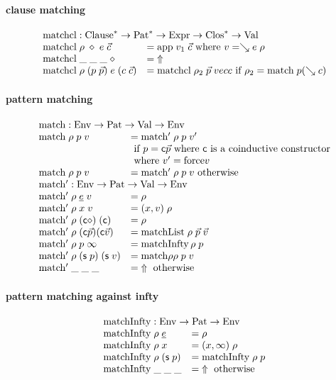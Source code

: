 \paragraph*{clause matching}
\[
\begin{array}{ll}
\multicolumn{2}{l}{\matchcl : \ves{\Clause} \ra \ves{\Pat} \ra \Expr \ra \ves{\Clos} \ra \Val}\\
\matchcl \; \rho \; \diamond \; e \; \vec{c} & = \ap \; v_1 \; \vec{c} \mbox{ where } v = \wh e \; \rho \\
\matchcl \; \_ \; \_\; \_ \; \diamond & = \stuck \\
\matchcl \; \rho \; (p \; \vec{p}) \; e \; (c \; \vec{c}) & = \matchcl \; \rho_2 \; \vec{p} \; vec{c} \mbox{ if } \rho_2 = \match \; p (\wh c)   
\end{array}
\]

\paragraph*{pattern matching}
\[
\begin{array}{ll}
\multicolumn{2}{l}{\match : \Env \ra \Pat \ra \Val \ra \Env}\\
\match \; \rho \; p \; v & = \matchf \; \rho \; p \; v' \\
& \mbox{ if } p = \cc \vec{p} \mbox{ where } \cc  \mbox{ is a coinductive constructor}\\
& \mbox{ where } v' = \forc v \\
\match \; \rho \; p \; v & = \matchf \; \rho \; p \; v \mbox{ otherwise}\\
\multicolumn{2}{l}{\matchf : \Env \ra \Pat \ra \Val \ra \Env}\\
\matchf \; \rho \; \inacc{e} \; v & = \rho \\
\matchf \; \rho \; x \; v & = (x,v)\; \rho \\
\matchf \; \rho \; (\cc \diamond) \; (\cc) & = \rho \\
\matchf \; \rho \; (\cc \vec{p}) (\cc \vec{v}) & = \matchList \; \rho \; \vec{p} \; \vec{v} \\
\matchf \; \rho \; p \; \infty & = \matchInfty \, \rho \; p \\
\matchf \; \rho \; (\s p) \; (\s v) & = \match \rho \rho \; p \; v \\
\matchf \; \_ \; \_ \; \_ & = \stuck \mbox{ otherwise}
\end{array}
\]

\paragraph*{pattern matching against infty}
\[
\begin{array}{ll}
\multicolumn{2}{l}{\matchInfty : \Env \ra \Pat \ra \Env}\\
\matchInfty \; \rho \; \inacc{e} & = \rho\\
\matchInfty \; \rho \; x & = (x,\infty)\; \rho \\
\matchInfty \; \rho \; (\s p)  & = \matchInfty \; \rho \; p \\
\matchInfty \; \_ \; \_ \; \_ & = \stuck \mbox{ otherwise}
\end{array}
\]
